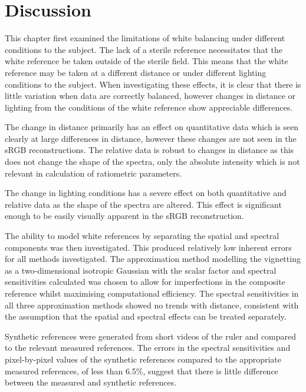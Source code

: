 \FloatBarrier
\section{Discussion}
\label{conclusions}
This chapter first examined the limitations of white balancing under different conditions to the subject. The lack of a sterile reference necessitates that the white reference be taken outside of the sterile field. This means that the white reference may be taken at a different distance or under different lighting conditions to the subject. When investigating these effects, it is clear that there is little variation when data are correctly balanced, however changes in distance or lighting from the conditions of the white reference show appreciable differences. 

The change in distance primarily has an effect on quantitative data which is seen clearly at large differences in distance, however these changes are not seen in the sRGB reconstructions. The relative data is robust to changes in distance as this does not change the shape of the spectra, only the absolute intensity which is not relevant in calculation of ratiometric parameters. 

The change in lighting conditions has a severe effect on both quantitative and relative data as the shape of the spectra are altered. This effect is significant enough to be easily visually apparent in the sRGB reconstruction. 

The ability to model white references by separating the spatial and spectral components was then investigated. This produced relatively low inherent errors for all methods investigated. The approximation method modelling the vignetting as a two-dimensional isotropic Gaussian with the scalar factor and spectral sensitivities calculated was chosen to allow for imperfections in the composite reference whilst maximising computational efficiency. The spectral sensitivities in all three approximation methods showed no trends with distance, consistent with the assumption that the spatial and spectral effects can be treated separately. 

Synthetic references were generated from short videos of the ruler and compared to the relevant measured references. The errors in the spectral sensitivities and pixel-by-pixel values of the synthetic references compared to the appropriate measured references, of less than 6.5\%, suggest that there is little difference between the measured and synthetic references. 

